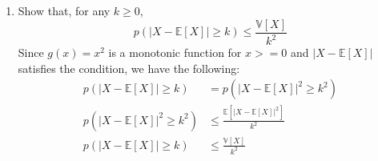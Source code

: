 \documentclass{article}
\begin{document}
\begin{enumerate} [label=(\arabic*)]
\begin{enumerate} [label=(\alph*)]
		\item Show that, for any $k \ge 0$,
			\begin{equation*}
				p(|X-\mathbb{E}[X]| \ge k) \le \frac{\mathbb{V}[X]}{k^2}
			\end{equation*}
			Since $g(x)=x^2$ is a monotonic function for $x >= 0$ and
				$|X-\mathbb{E}[X]|$ satisfies the condition, we have the following:
				\begin{align*}
					p(|X-\mathbb{E}[X]| \ge k) &= p(|X-\mathbb{E}[X]|^2 \ge k^2)\\
					p(|X-\mathbb{E}[X]|^2 \ge k^2) &\le
						\frac{\mathbb{E}[|X-\mathbb{E}[X]|^2]}{k^2}\\
					p(|X-\mathbb{E}[X]| \ge k) &\le
						\frac{\mathbb{V}[X]}{k^2}
				\end{align*}
		\end{enumerate}
\end{enumerate}
\end{document}
